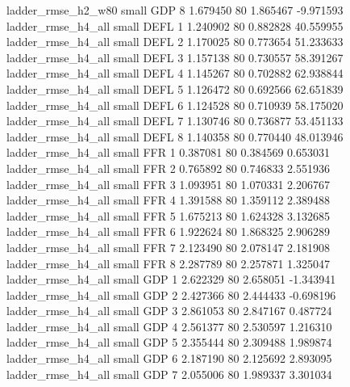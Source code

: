       ladder_rmse_h2_w80      small      GDP                 8 1.679450 80       1.865467          -9.971593
      ladder_rmse_h4_all      small     DEFL                 1 1.240902 80       0.882828          40.559955
      ladder_rmse_h4_all      small     DEFL                 2 1.170025 80       0.773654          51.233633
      ladder_rmse_h4_all      small     DEFL                 3 1.157138 80       0.730557          58.391267
      ladder_rmse_h4_all      small     DEFL                 4 1.145267 80       0.702882          62.938844
      ladder_rmse_h4_all      small     DEFL                 5 1.126472 80       0.692566          62.651839
      ladder_rmse_h4_all      small     DEFL                 6 1.124528 80       0.710939          58.175020
      ladder_rmse_h4_all      small     DEFL                 7 1.130746 80       0.736877          53.451133
      ladder_rmse_h4_all      small     DEFL                 8 1.140358 80       0.770440          48.013946
      ladder_rmse_h4_all      small      FFR                 1 0.387081 80       0.384569           0.653031
      ladder_rmse_h4_all      small      FFR                 2 0.765892 80       0.746833           2.551936
      ladder_rmse_h4_all      small      FFR                 3 1.093951 80       1.070331           2.206767
      ladder_rmse_h4_all      small      FFR                 4 1.391588 80       1.359112           2.389488
      ladder_rmse_h4_all      small      FFR                 5 1.675213 80       1.624328           3.132685
      ladder_rmse_h4_all      small      FFR                 6 1.922624 80       1.868325           2.906289
      ladder_rmse_h4_all      small      FFR                 7 2.123490 80       2.078147           2.181908
      ladder_rmse_h4_all      small      FFR                 8 2.287789 80       2.257871           1.325047
      ladder_rmse_h4_all      small      GDP                 1 2.622329 80       2.658051          -1.343941
      ladder_rmse_h4_all      small      GDP                 2 2.427366 80       2.444433          -0.698196
      ladder_rmse_h4_all      small      GDP                 3 2.861053 80       2.847167           0.487724
      ladder_rmse_h4_all      small      GDP                 4 2.561377 80       2.530597           1.216310
      ladder_rmse_h4_all      small      GDP                 5 2.355444 80       2.309488           1.989874
      ladder_rmse_h4_all      small      GDP                 6 2.187190 80       2.125692           2.893095
      ladder_rmse_h4_all      small      GDP                 7 2.055006 80       1.989337           3.301034
